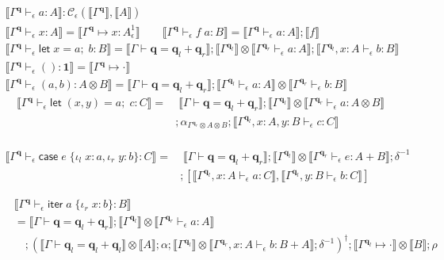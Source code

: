 \documentclass[acmsmall,screen,review]{acmart}
\newcommand{\mc}[1]{\ensuremath{\mathcal{#1}}}
\newcommand{\mb}[1]{\ensuremath{\mathbf{#1}}}
\newcommand{\ms}[1]{\ensuremath{\mathsf{#1}}}
\newcommand{\lto}{:}
\newcommand{\linl}[1]{\iota_l\;{#1}}
\newcommand{\linr}[1]{\iota_r\;{#1}}
\newcommand{\letexpr}[3]{\ensuremath{\ms{let}\;#1 = #2;\;#3}}
\newcommand{\caseexpr}[5]{\ms{case}\;#1\;\{\linl{#2} \lto #3, \linr{#4} \lto #5\}}
\newcommand{\liter}[3]{\ms{iter}\;#1\;\{ \linr{#2} \lto #3 \}}
\newcommand{\qsp}[4]{#1 \vdash #2 = #3 + #4}
\newcommand{\cwk}[2]{#1 \mapsto #2}
\newcommand{\hasty}[4]{#1 \vdash_{#2} #3: {#4}}
\newcommand{\dnt}[1]{\llbracket{#1}\rrbracket}
\newcommand{\oneq}{1}
\begin{document}
\begin{gather*}
  \boxed{\dnt{\hasty{\Gamma^{\mb{q}}}{\epsilon}{a}{A}} 
    : \mc{C}_\epsilon(\dnt{\Gamma^{\mb{q}}}, \dnt{A})} \\
  \dnt{\hasty{\Gamma^{\mb{q}}}{\epsilon}{x}{A}} 
    = \dnt{\cwk{\Gamma^{\mb{q}}}{x : A^\oneq_\epsilon}}
  \qquad
  \dnt{\hasty{\Gamma^{\mb{q}}}{\epsilon}{f\;a}{B}} 
    = \dnt{\hasty{\Gamma^{\mb{q}}}{\epsilon}{a}{A}} ; \dnt{f} \\
  \dnt{\hasty{\Gamma^{\mb{q}}}{\epsilon}{\letexpr{x}{a}{b}}{B}} 
    = \dnt{\qsp{\Gamma}{\mb{q}}{\mb{q}_l}{\mb{q}_r}}
    ; \dnt{\Gamma^{\mb{q}_l}} 
      \otimes \dnt{\hasty{\Gamma^{\mb{q}_r}}{\epsilon}{a}{A}}
    ; \dnt{\hasty{\Gamma^{\mb{q}_l}, x : A}{\epsilon}{b}{B}}
  \\
  \dnt{\hasty{\Gamma^{\mb{q}}}{\epsilon}{()}{\mb{1}}}
    = \dnt{\cwk{\Gamma^{\mb{q}}}{\cdot}}
  \\
  \dnt{\hasty{\Gamma^{\mb{q}}}{\epsilon}{(a, b)}{A \otimes B}}
    = \dnt{\qsp{\Gamma}{\mb{q}}{\mb{q}_l}{\mb{q}_r}}
    ; \dnt{\hasty{\Gamma^{\mb{q}_l}}{\epsilon}{a}{A}}
    \otimes \dnt{\hasty{\Gamma^{\mb{q}_r}}{\epsilon}{b}{B}}
\end{gather*}
\begin{align*}
  \dnt{\hasty{\Gamma^{\mb{q}}}{\epsilon}{\letexpr{(x, y)}{a}{c}}{C}}
  = & \; \dnt{\qsp{\Gamma}{\mb{q}}{\mb{q}_l}{\mb{q}_r}}
    ; \dnt{\Gamma^{\mb{q}_l}}
    \otimes \dnt{\hasty{\Gamma^{\mb{q}_r}}{\epsilon}{a}{A \otimes B}}
  \\ & 
  ; \alpha_{\Gamma^{\mb{q}_r} \otimes A \otimes B}
  ; \dnt{\hasty{\Gamma^{\mb{q}_l}, x : A, y : B}{\epsilon}{c}{C}} \\
\end{align*}

\begin{align*}
  \dnt{\hasty{\Gamma^{\mb{q}}}{\epsilon}{\caseexpr{e}{x}{a}{y}{b}}{C}}
  =& \; 
  \dnt{\qsp{\Gamma}{\mb{q}}{\mb{q}_l}{\mb{q}_r}}
  ; \dnt{\Gamma^{\mb{q}_l}} 
  \otimes \dnt{\hasty{\Gamma^{\mb{q}_r}}{\epsilon}{e}{A + B}}
  ; \delta^{-1} \\ & 
  ; [
    \dnt{\hasty{\Gamma^{\mb{q}_l}, x : A}{\epsilon}{a}{C}},
    \dnt{\hasty{\Gamma^{\mb{q}_l}, y : B}{\epsilon}{b}{C}}
  ]
\end{align*}


\begin{align*}
  &\dnt{\hasty{\Gamma^{\mb{q}}}{\epsilon}{\liter{a}{x}{b}}{B}} \\
  &= 
  \dnt{\qsp{\Gamma}{\mb{q}}{\mb{q}_l}{\mb{q}_r}}
  ; \dnt{\Gamma^{\mb{q}_l}}
    \otimes \dnt{\hasty{\Gamma^{\mb{q}_r}}{\epsilon}{a}{A}} \\ & \quad 
  ; (\dnt{\qsp{\Gamma}{\mb{q}_l}{\mb{q}_l}{\mb{q}_l}} \otimes \dnt{A} 
  ; \alpha
  ; \dnt{\Gamma^{\mb{q}_l}} 
    \otimes \dnt{\hasty{\Gamma^{\mb{q}_r}, x : A}{\epsilon}{b}{B + A}}
  ; \delta^{-1})^\dagger
  ; \dnt{\cwk{\Gamma^{\mb{q}_l}}{\cdot}} \otimes \dnt{B}
  ; \rho
\end{align*}
\end{document}
